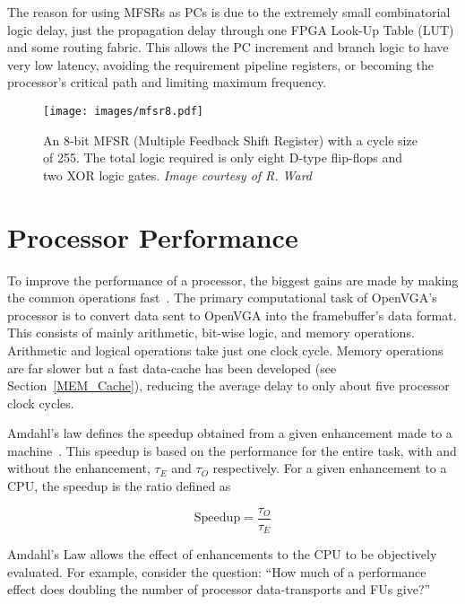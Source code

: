 The reason for using MFSRs as PCs is due to the extremely small combinatorial
logic delay, just the propagation delay through one FPGA Look-Up
Table (LUT) and some routing
fabric. This allows the PC increment and branch logic to have very low latency,
avoiding the requirement pipeline registers, or becoming the processor's critical
path and limiting maximum frequency.

\begin{figure}[h!]
\begin{center}
\texttt{[image: images/mfsr8.pdf]}
\caption[An 8-bit MFSR with a cycle size of 255]{An 8-bit MFSR (Multiple
Feedback Shift Register) with a cycle size of 255. The total logic required is
only eight D-type flip-flops and two XOR logic gates. \textit{Image courtesy
of R. Ward}~\cite{MFSR_List}}
\label{CPU_MFSR8}
\end{center}
\end{figure}


\section{Processor Performance}
To improve the performance of a processor, the biggest gains are made by making
the common operations fast~\cite{Comp_Arch}. The primary computational task of
OpenVGA's processor is to convert data sent to OpenVGA into the framebuffer's
data format. This consists of mainly arithmetic, bit-wise logic, and memory
operations. Arithmetic and logical operations take just one clock cycle. Memory
operations are far slower but a fast data-cache has been developed (see
Section~\ref{MEM_Cache}), reducing the average delay to only about five processor
clock cycles.


Amdahl's law defines the speedup obtained from a given enhancement made to a
machine~\cite{Comp_Arch}. This speedup is based on the performance for the entire
task, with and without the enhancement, $\tau_E$ and $\tau_O$ respectively. For a
given enhancement to a CPU, the speedup is the ratio defined as

\[
\mathrm{Speedup} = \frac{\tau_O}{\tau_E}
\]

Amdahl's Law allows the effect of enhancements to the CPU to be objectively
evaluated. For example, consider the question: ``How much of a performance effect
does doubling the number of processor data-transports and FUs give?''

